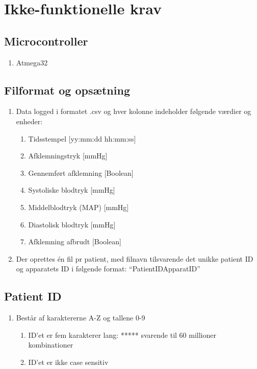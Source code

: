 	\chapter{Ikke-funktionelle krav }
	
	\section{Microcontroller}
	\begin{enumerate}
		\setlength\itemsep{0cm}
		\item Atmega32
		\end{enumerate}
	
	\section{Filformat og opsætning}
	\begin{enumerate}
		\setlength\itemsep{0cm} %
		\item Data logged i formatet .csv og hver kolonne indeholder følgende værdier og enheder: 
		\begin{enumerate}
			\item Tidsstempel [yy:mm:dd hh:mm:ss]
			\item Afklemningstryk [mmHg]
			\item Gennemført afklemning [Boolean]
			\item Systoliske blodtryk [mmHg]
			\item Middelblodtryk (MAP) [mmHg]
			\item Diastolisk blodtryk [mmHg]
			\item Afklemning afbrudt [Boolean]
		\end{enumerate}
		\item Der oprettes én fil pr patient, med filnavn tilsvarende det unikke patient ID og apparatets ID i følgende format: “PatientIDApparatID”
	\end{enumerate}
	
	\section{Patient ID}
	\begin{enumerate}
		\setlength\itemsep{0cm} %
		\item Består af karaktererne A-Z og tallene 0-9
		\begin{enumerate}
			\item ID’et er fem karakterer lang: ***** svarende til 60 millioner kombinationer
			\item ID’et er ikke case sensitiv
		\end{enumerate}
	\end{enumerate}
	
